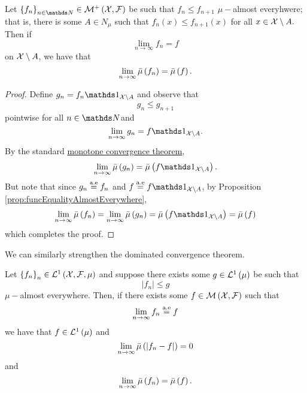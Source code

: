 \begin{thm}
\label{thm:generalizedMonotoneConvergence} Let $\left\{ f_{n}\right\} _{n\in\N}\in\nonnegMeasurableFunctions$
be such that $f_{n}\leq f_{n+1}$ $\mu-$almost everyhwere; that is,
there is some $A\in N_{\mu}$ such that $f_{n}\left(x\right)\leq f_{n+1}\left(x\right)$
for all $x\in\mathcal{X}\setminus A.$ Then if 
\[
\lim_{n\to\infty}f_{n}=f
\]
 on $\mathcal{X}\setminus A$, we have that
\[
\lim_{n\to\infty}\bar{\mu}\left(f_{n}\right)=\bar{\mu}\left(f\right).
\]
\end{thm}

\begin{proof}
Define $g_{n}=f_{n}\indicate_{\X\setminus A}$ and observe that 
\[
g_{n}\leq g_{n+1}
\]
pointwise for all $n\in\N$and 
\[
\lim_{n\to\infty}g_{n}=f\indicate_{\X\setminus A}.
\]
By the standard \hyperref[thm:monotoneConvergenceLebInt]{monotone convergence theorem},
\[
\lim_{n\to\infty}\lebInt{\mu}{g_{n}}=\lebInt{\mu}{f\indicate_{\X\setminus A}}.
\]
But note that since $g_{n}\stackrel{\textnormal{a.e}}{=}f_{n}$ and
$f\stackrel{\textnormal{a.e}}{=}f\indicate_{\X\setminus A}$, by Proposition
\ref{prop:funcEqualityAlmostEverywhere},
\[
\lim_{n\to\infty}\lebInt{\mu}{f_{n}}=\lim_{n\to\infty}\lebInt{\mu}{g_{n}}=\lebInt{\mu}{f\indicate_{\X\setminus A}}=\lebInt{\mu}f
\]
which completes the proof.
\end{proof}
We can similarly strengthen the dominated convergence theorem.
\begin{thm}
\label{thm:generalizedDominatedConvergence}Let $\left\{ f_{n}\right\} _{n}\in\mathcal{L}^{1}\left(\mathcal{X},\mathcal{F},\mu\right)$
and suppose there exists some $g\in\mathcal{L}^{1}\left(\mu\right)$ be such that
\[
\lvert f_{n}\rvert\leq g
\]
$\mu-$almost everywhere. Then, if there exists some $f\in\mathcal{M}\left(\mathcal{X},\mathcal{F}\right)$
such that 
\[
\lim_{n\to\infty}f_{n}\stackrel{\textnormal{a.e}}{=}f
\]
we have that $f\in\mathcal{L}^{1}\left(\mu\right)$ and
\[
\lim_{n\to\infty}\bar{\mu}\left(\lvert f_{n}-f\rvert\right)=0
\]
and 
\[
\lim_{n\to\infty}\bar{\mu}\left(f_{n}\right)=\bar{\mu}\left(f\right).
\]
\end{thm}

